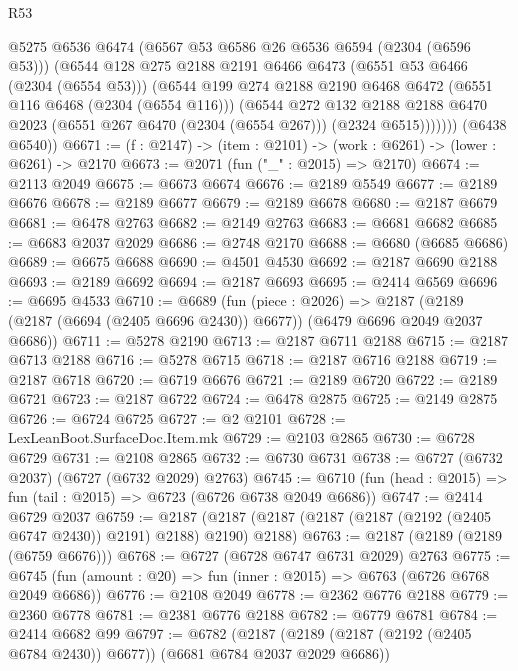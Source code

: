 \begin{lexlean}{R53}
\begin{coremodule}
            @5275
            @6536
            @6474
            (@6567 @53 @6586 @26 @6536 @6594 (@2304 (@6596 @53)))
            (@6544
              @128
              @275
              @2188
              @2191
              @6466
              @6473
              (@6551 @53 @6466 (@2304 (@6554 @53)))
              (@6544
                @199
                @274
                @2188
                @2190
                @6468
                @6472
                (@6551 @116 @6468 (@2304 (@6554 @116)))
                (@6544
                  @272
                  @132
                  @2188
                  @2188
                  @6470
                  @2023
                  (@6551 @267 @6470 (@2304 (@6554 @267)))
                  (@2324 @6515)))))))
      (@6438 @6540))
@6671 := (f : @2147) -> (item : @2101) -> (work : @6261) -> (lower : @6261) -> @2170
@6673 := @2071 (fun ("_" : @2015) => @2170)
@6674 := @2113 @2049
@6675 := @6673 @6674
@6676 := @2189 @5549
@6677 := @2189 @6676
@6678 := @2189 @6677
@6679 := @2189 @6678
@6680 := @2187 @6679
@6681 := @6478 @2763
@6682 := @2149 @2763
@6683 := @6681 @6682
@6685 := @6683 @2037 @2029
@6686 := @2748 @2170
@6688 := @6680 (@6685 @6686)
@6689 := @6675 @6688
@6690 := @4501 @4530
@6692 := @2187 @6690 @2188
@6693 := @2189 @6692
@6694 := @2187 @6693
@6695 := @2414 @6569
@6696 := @6695 @4533
@6710 := @6689
    (fun (piece : @2026) =>
    @2187 (@2189 (@2187 (@6694 (@2405 @6696 @2430)) @6677)) (@6479 @6696 @2049 @2037 @6686))
@6711 := @5278 @2190
@6713 := @2187 @6711 @2188
@6715 := @2187 @6713 @2188
@6716 := @5278 @6715
@6718 := @2187 @6716 @2188
@6719 := @2187 @6718
@6720 := @6719 @6676
@6721 := @2189 @6720
@6722 := @2189 @6721
@6723 := @2187 @6722
@6724 := @6478 @2875
@6725 := @2149 @2875
@6726 := @6724 @6725
@6727 := @2 @2101
@6728 := LexLeanBoot.SurfaceDoc.Item.mk
@6729 := @2103 @2865
@6730 := @6728 @6729
@6731 := @2108 @2865
@6732 := @6730 @6731
@6738 := @6727 (@6732 @2037) (@6727 (@6732 @2029) @2763)
@6745 := @6710 (fun (head : @2015) => fun (tail : @2015) => @6723 (@6726 @6738 @2049 @6686))
@6747 := @2414 @6729 @2037
@6759 := @2187 (@2187 (@2187 (@2187 (@2187 (@2192 (@2405 @6747 @2430)) @2191) @2188) @2190) @2188)
@6763 := @2187 (@2189 (@2189 (@6759 @6676)))
@6768 := @6727 (@6728 @6747 @6731 @2029) @2763
@6775 := @6745 (fun (amount : @20) => fun (inner : @2015) => @6763 (@6726 @6768 @2049 @6686))
@6776 := @2108 @2049
@6778 := @2362 @6776 @2188
@6779 := @2360 @6778
@6781 := @2381 @6776 @2188
@6782 := @6779 @6781
@6784 := @2414 @6682 @99
@6797 := @6782
    (@2187 (@2189 (@2187 (@2192 (@2405 @6784 @2430)) @6677)) (@6681 @6784 @2037 @2029 @6686))

\end{coremodule}
\end{lexlean}
